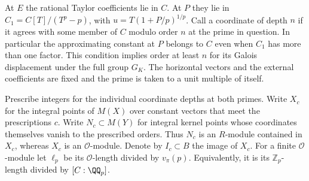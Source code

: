 \documentclass[a4paper,11pt]{article}
\theoremstyle{definition}
\theoremstyle{remark}
\newcommand{\ZZ}{\mathbb Z}\newcommand{\ord}{\operatorname{ord}}
\numberwithin{equation}{section}
\begin{document}
At \(E\) the rational Taylor coefficients lie in \(C\).
At \(P\) they lie in \(C_1=C[T]/(T^p-p)\), with
\(u=T(1+P/p)^{1/p}\). Call a coordinate of depth \(n\) if
it agrees with some member of \(C\) modulo order \(n\)
at the prime in question. In particular the approximating
constant at \(P\) belongs to \(C\) even when \(C_1\) has more
than one factor. This condition implies order at least \(n\)
for its Galois displacement under the full group \(G_K\).
The horizontal vectors and the external coefficients are fixed
and the prime is taken to a unit multiple of itself.

Prescribe integers for the individual coordinate depths at
both primes. Write \(X_c\) for the integral points of \(M(X)\)
over constant vectors that meet the prescriptions \(c\).
Write \(N_c\subset M(Y)\) for integral kernel points whose
coordinates themselves vanish to the prescribed orders. Thus
\(N_c\) is an \(R\)-module contained in \(X_c\), whereas
\(X_c\) is an \(\mathcal O\)-module. Denote by \(I_c\subset B\)
the image of \(X_c\). For a finite \(\mathcal O\)-module
let \(\ell_p\) be its \(\mathcal O\)-length divided by
\(v_\pi(p)\). Equivalently, it is its \(\ZZ_p\)-length
divided by \([C:\QQ_p]\).
\end{document}
